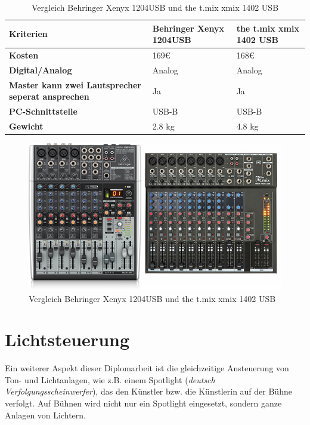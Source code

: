 \begin{table} [H]
	\begin{tabular}{ |p{3.1cm} |p{4.8cm}|p{4.8cm}| }
		\hline
		\textbf{Kriterien} & \textbf{Behringer Xenyx 1204USB}& \textbf{the t.mix xmix 1402 USB}\\
		\hline
		\textbf{Kosten} & 169€ & 168€  \\ 
		\hline
		\textbf{Digital/Analog} & Analog & Analog   \\  
		\hline
		\textbf{Master kann zwei Lautsprecher seperat ansprechen} & Ja & Ja \\
		\hline
		\textbf{PC-Schnittstelle} & USB-B & USB-B  \\
		\hline
		\textbf{Gewicht}& 2.8 kg & 4.8 kg \\
		\hline	
	\end{tabular}
	\caption{Vergleich Behringer Xenyx 1204USB und the t.mix xmix 1402 USB} 
\end{table} 

\begin{figure}[H]
	\centering
	\includegraphics[width=0.8\linewidth]{images/the.t.mix.xmix1402-Behringer1204USB.png}
	\caption[Vergleich Behringer Xenyx 1204USB und the t.mix xmix 1402 USB]{Vergleich Behringer Xenyx 1204USB und the t.mix xmix 1402 USB}
	\label{fig:Behringer Xenyx 1204USB-the t.mix xmix 1402 USB}
\end{figure}

\section{Lichtsteuerung}
Ein weiterer Aspekt dieser Diplomarbeit ist die gleichzeitige Ansteuerung von Ton- und Lichtanlagen, wie z.B. einem Spotlight (\textit{deutsch Verfolgungsscheinwerfer}), das den Künstler bzw. die Künstlerin auf der Bühne verfolgt. Auf Bühnen wird nicht nur ein Spotlight eingesetzt, sondern ganze Anlagen von Lichtern. 

